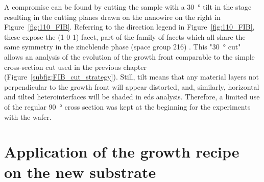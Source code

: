 A compromise can be found by cutting the sample with a \qty{30}{\degree} tilt in the stage resulting in the cutting planes drawn on the nanowire on the right in Figure~\ref{fig:110_FIB}. Referring to the direction legend in Figure~\ref{fig:110_FIB}, these expose the \hkl(1 0 1) facet, part of the family of  facets which all share the same symmetry in the zincblende phase (space group \num{216}) \cite{wyckoff1963crystal, osti_gaas_zb, osti_inas_zb, osti_inp_zb}. This "\qty{30}{\degree} cut" allows an analysis of the evolution of the growth front comparable to the simple cross-section cut used in the previous chapter (Figure~\ref{subfig:FIB_cut_strategy}). Still, tilt means that any material layers not perpendicular to the growth front will appear distorted, and, similarly, horizontal and tilted heterointerfaces will be shaded in \acs{eds} analysis. Therefore, a limited use of the regular \qty{90}{\degree} cross section was kept at the beginning for the experiments with the  wafer.

\section{Application of the growth recipe on the new substrate}
\label{sec:s4}

